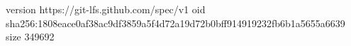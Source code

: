 version https://git-lfs.github.com/spec/v1
oid sha256:1808eace0af38ac9df3859a5f4d72a19d72b0bff914919232fb6b1a5655a6639
size 349692

